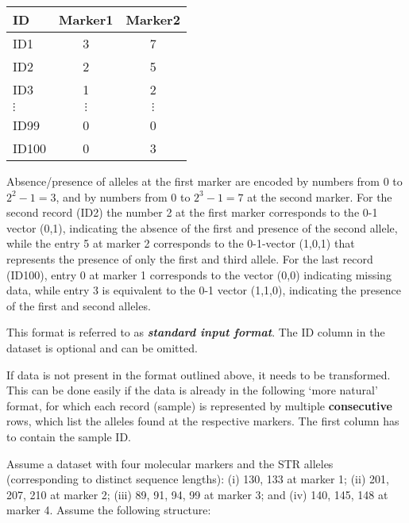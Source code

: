 \documentclass[
]{article}
\begin{document}
\begin{table}[tbh]
\begin{center}
\begin{tabular}[5cm]{|l|c|c|}
\hline
ID & Marker1 & Marker2\\
\hline
ID1 & 3 & 7\\
\hline
ID2 & 2 & 5\\
\hline
ID3 & 1 & 2\\
\hline
$\vdots$ & $\vdots$ & $\vdots$\\
\hline
ID99 & 0 & 0\\
\hline
ID100 & 0 & 3\\
\hline
\end{tabular}
\end{center}
\label{tab:table1man}
\end{table}

Absence/presence of alleles at the first marker are encoded by numbers
from 0 to \(2^2 - 1 = 3\), and by numbers from 0 to \(2^3 - 1 = 7\) at
the second marker. For the second record (ID2) the number 2 at the first
marker corresponds to the 0-1 vector (0,1), indicating the absence of
the first and presence of the second allele, while the entry 5 at marker
2 corresponds to the 0-1-vector (1,0,1) that represents the presence of
only the first and third allele. For the last record (ID100), entry 0 at
marker 1 corresponds to the vector (0,0) indicating missing data, while
entry 3 is equivalent to the 0-1 vector (1,1,0), indicating the presence
of the first and second alleles.

This format is referred to as \textbf{\textit{standard input format}}.
The ID column in the dataset is optional and can be omitted.

If data is not present in the format outlined above, it needs to be
transformed. This can be done easily if the data is already in the
following `more natural' format, for which each record (sample) is
represented by multiple \textbf{consecutive} rows, which list the
alleles found at the respective markers. The first column has to contain
the sample ID.

Assume a dataset with four molecular markers and the STR alleles
(corresponding to distinct sequence lengths): (i) 130, 133 at marker 1;
(ii) 201, 207, 210 at marker 2; (iii) 89, 91, 94, 99 at marker 3; and
(iv) 140, 145, 148 at marker 4. Assume the following structure:
\end{document}
